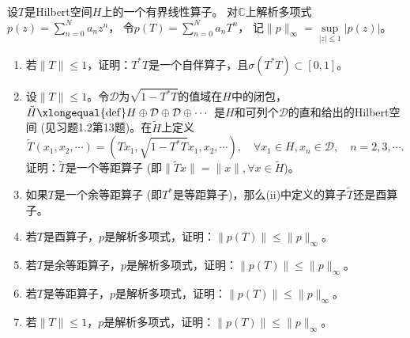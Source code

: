 \begin{11}
    设$T$是Hilbert空间$H$上的一个有界线性算子。
    对$\mathbb{C}$上解析多项式$\displaystyle p(z)=\sum_{n=0}^{N}a_nz^n$，
    令$\displaystyle p(T)=\sum_{n=0}^{N}a_nT^n$，
    记$\|p\|_\infty=\sup\limits_{|z|\leqslant1}|p(z)|$。
    \begin{enumerate}[label=(\roman*)]
    \item 若$\|T\|\leqslant1$，证明：$T^*T$是一个自伴算子，且$\sigma(T^*T)\subset[0,1]$。
    \item 设$\|T\|\leqslant1$。令$\mathcal{D}$为$\sqrt{1-T^*T}$的值域在$H$中的闭包，
    $\tilde{H}\xlongequal{\rm def}H\oplus\mathcal{D}\oplus\mathcal{D}\oplus\cdots$
    是$H$和可列个$\mathcal{D}$的直和给出的Hilbert空间 (见习题1.2第13题)。在$\tilde{H}$上定义
    \[\tilde{T}(x_1,x_2,\cdots)=(Tx_1,\sqrt{1-T^*T}x_1,x_2,\cdots),
    \quad \forall x_1 \in H,x_n \in \mathcal{D},\quad n=2,3,\cdots.\]
    证明：$\tilde{T}$是一个等距算子 (即$\|\tilde{T}x\|=\|x\|,\forall x\in\tilde{H}$)。
    \item 如果$T$是一个余等距算子 (即$T^*$是等距算子)，那么(ii)中定义的算子$\tilde{T}$还是酉算子。
    \item 若$T$是酉算子，$p$是解析多项式，证明：$\|p(T)\|\leqslant\|p\|_\infty$。
    \item 若$T$是余等距算子，$p$是解析多项式，证明：$\|p(T)\|\leqslant\|p\|_\infty$。
    \item 若$T$是等距算子，$p$是解析多项式，证明：$\|p(T)\|\leqslant\|p\|_\infty$。
    \item 若$\|T\|\leqslant1$，$p$是解析多项式，证明：$\|p(T)\|\leqslant\|p\|_\infty$。
    \end{enumerate}
\end{11}
